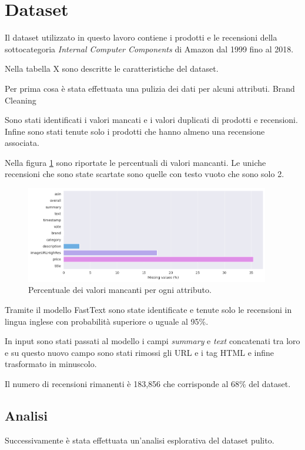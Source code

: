 \section{Dataset}
Il dataset utilizzato in questo lavoro contiene i prodotti e le recensioni della sottocategoria \textit{Internal Computer Components} di Amazon dal 1999 fino al 2018.

Nella tabella X sono descritte le caratteristiche del dataset. %

Per prima cosa è stata effettuata una pulizia dei dati per alcuni attributi.
%
Brand Cleaning

Sono stati identificati i valori mancati e i valori duplicati di prodotti e recensioni. 
Infine sono stati tenute solo i prodotti che hanno almeno una recensione associata.

Nella figura \ref{fig:missing_values} sono riportate le percentuali di valori mancanti. Le uniche recensioni che sono state 
scartate sono quelle con testo vuoto che sono solo 2.


\begin{figure}[ht]
  \centering
  \includegraphics[width=0.95\textwidth]{images/dataset/missing_values.png}
  \caption{Percentuale dei valori mancanti per ogni attributo.}
  \label{fig:missing_values}
\end{figure}

Tramite il modello FastText \cite{joulin2016bag} sono state identificate e tenute 
solo le recensioni in lingua inglese con probabilità superiore o uguale al 95\%.

In input sono stati passati al modello i campi \textit{summary} e \textit{text} concatenati tra loro e su questo nuovo 
campo sono stati rimossi gli URL e i tag HTML e infine trasformato in minuscolo.

Il numero di recensioni rimanenti è 183,856 che corrisponde al 68\% del dataset.


\subsection{Analisi}
Successivamente è stata effettuata un'analisi esplorativa del dataset pulito.
